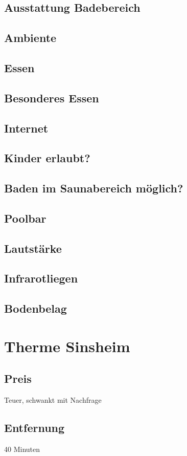 \documentclass{article}
\begin{document}
\subsection*{Ausstattung Badebereich}
\subsection*{Ambiente}
\subsection*{Essen}
\subsection*{Besonderes Essen}
\subsection*{Internet}
\subsection*{Kinder erlaubt?}
\subsection*{Baden im Saunabereich möglich?}
\subsection*{Poolbar}
\subsection*{Lautstärke}
\subsection*{Infrarotliegen}
\subsection*{Bodenbelag}
\pagebreak

\section*{Therme Sinsheim}
\subsection*{Preis} Teuer, schwankt mit Nachfrage
\subsection*{Entfernung} 40 Minuten
\end{document}
